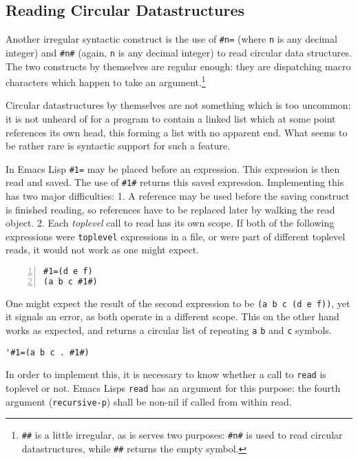 \documentclass[a4paper,10pt,twoside]{report}
\newcommand{\el}{Emacs Lisp}
\newcommand{\sym}[1]{\texttt{#1}}
\newcommand{\fun}[1]{\texttt{#1}}
\newcommand{\Read}{\fun{read}}
\begin{document}
\subsection{Reading Circular Datastructures}
\label{subsec:circular-datastructures}

Another irregular syntactic construct is the use of \texttt{\#n=} (where
\texttt{n} is any decimal integer) and \texttt{\#n\#} (again, \texttt{n} is any
decimal integer) to read circular data structures.  The two constructs by
themselves are regular enough: they are dispatching macro characters which
happen to take an argument.\footnote{\texttt{\#\#} is a little irregular, as is
  serves two purposes: \texttt{\#n\#} is used to read circular datastructures,
  while \texttt{\#\#} returns the empty symbol.}

Circular datastructures by themselves are not something which is too uncommon:
it is not unheard of for a program to contain a linked list which at some point
references its own head, this forming a list with no apparent end.  What seems
to be rather rare is syntactic support for such a feature.

In \el{} \texttt{\#1=} may be placed before an expression.  This expression is
then read and saved.  The use of \texttt{\#1\#} returns this saved expression.
Implementing this has two major difficulties:  1. A reference may be used before
the saving construct is finished reading, so references have to be replaced
later by walking the read object.  2. Each \emph{toplevel} call to read has its
own scope.  If both of the following expressions were \texttt{toplevel}
expressions in a file, or were part of different toplevel reads, it would not
work as one might expect.

\begin{lstlisting}[style=lispcode,label={code:circular-toplevel-broken},caption={This
  does not work as expected},numbers=left]
#1=(d e f)
(a b c #1#)
\end{lstlisting}

One might expect the result of the second expression to be \texttt{(a b c (d e
  f))}, yet it signals an error, as both operate in a different scope.  This on
the other hand works as expected, and returns a circular list of repeating
\texttt{a} \texttt{b} and \texttt{c} symbols.

\begin{lstlisting}[style=lispinline]
'#1=(a b c . #1#)
\end{lstlisting}

In order to implement this, it is necessary to know whether a call to \Read{} is
toplevel or not.  \el{}s \Read{} has an argument for this purpose: the fourth
argument (\sym{recursive-p}) shall be non-nil if called from within read.
\end{document}
